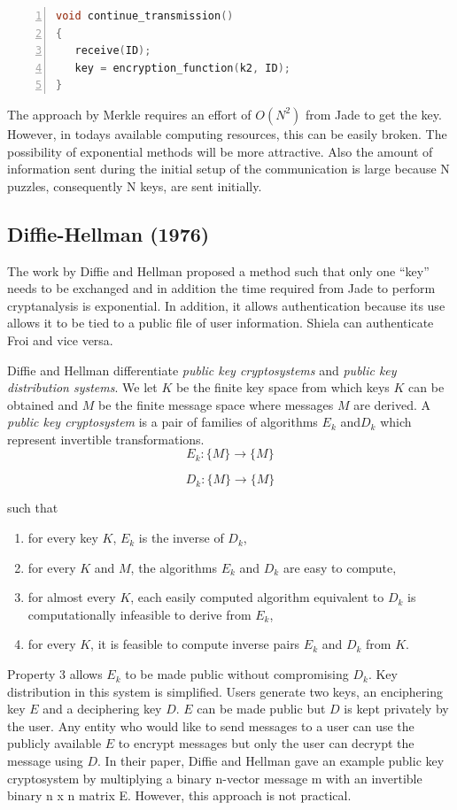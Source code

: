 \documentclass{article}
\begin{document}
\begin{lstlisting}[language=C,numbers=left]
void continue_transmission()
{
   receive(ID);
   key = encryption_function(k2, ID);
}
\end{lstlisting}


The approach by Merkle requires an effort of $O(N^{2})$ from Jade
to get the key. However, in todays available computing resources,
this can be easily broken. The possibility of exponential methods
will be more attractive. Also the amount of information sent during
the initial setup of the communication is large because N puzzles,
consequently N keys, are sent initially.


\subsection{Diffie-Hellman (1976)}

The work by Diffie and Hellman\cite{diffie_new_1976} proposed a method
such that only one ``key'' needs to be exchanged and in addition
the time required from Jade to perform cryptanalysis is exponential.
In addition, it allows authentication because its use allows it to
be tied to a public file of user information. Shiela can authenticate
Froi and vice versa. 

Diffie and Hellman differentiate \textit{public key cryptosystems}
and \textit{public key distribution systems}. We let ${K}$ be the
finite key space from which keys $K$ can be obtained and ${M}$ be
the finite message space where messages $M$ are derived. A \textit{public
key cryptosystem} is a pair of families of algorithms ${E_{k}}$ and${D_{k}}$
which represent invertible transformations\cite{diffie_new_1976}.
\[
E_{k}:\{M\}\rightarrow\{M\}
\]


\[
D_{k}:\{M\}\rightarrow\{M\}
\]


such that 
\begin{enumerate}
\item for every key $K$, $E_{k}$ is the inverse of $D_{k}$,
\item for every $K$ and $M$, the algorithms $E_{k}$ and $D_{k}$ are
easy to compute,
\item for almost every $K$, each easily computed algorithm equivalent to
$D_{k}$ is computationally infeasible to derive from $E_{k}$,
\item for every $K$, it is feasible to compute inverse pairs $E_{k}$ and
$D_{k}$ from $K$.
\end{enumerate}
Property 3 allows $E_{k}$ to be made public without compromising
$D_{k}$. Key distribution in this system is simplified. Users generate
two keys, an enciphering key $E$ and a deciphering key $D$. $E$
can be made public but $D$ is kept privately by the user. Any entity
who would like to send messages to a user can use the publicly available
$E$ to encrypt messages but only the user can decrypt the message
using $D$. In their paper, Diffie and Hellman gave an example public
key cryptosystem by multiplying a binary n-vector message m with an
invertible binary n x n matrix E. However, this approach is not practical.
\end{document}

